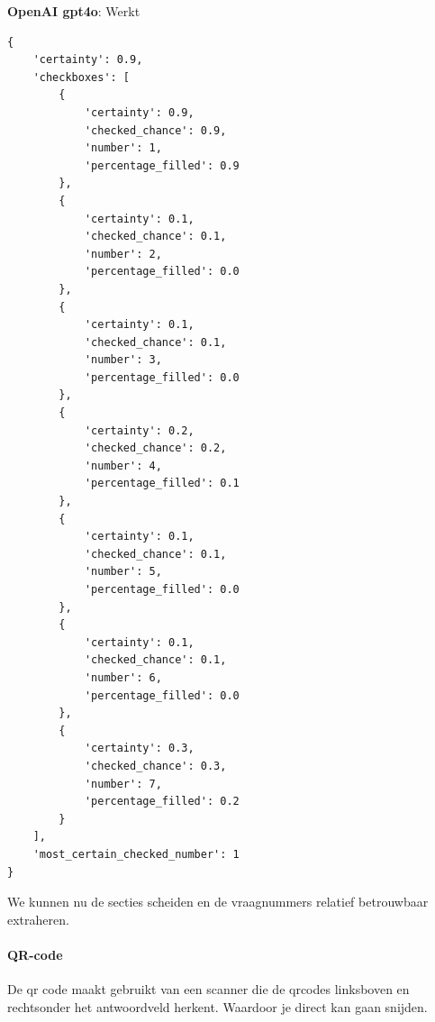 \documentclass[12pt]{article}
\begin{document}
\begin{samepage}
    
\textbf{OpenAI gpt4o}: Werkt
\begin{listing}[H]
    
    \begin{verbatim}
{
    'certainty': 0.9, 
    'checkboxes': [
        {
            'certainty': 0.9, 
            'checked_chance': 0.9, 
            'number': 1, 
            'percentage_filled': 0.9
        }, 
        {
            'certainty': 0.1, 
            'checked_chance': 0.1, 
            'number': 2, 
            'percentage_filled': 0.0
        }, 
        {
            'certainty': 0.1, 
            'checked_chance': 0.1, 
            'number': 3, 
            'percentage_filled': 0.0
        }, 
        {
            'certainty': 0.2, 
            'checked_chance': 0.2, 
            'number': 4, 
            'percentage_filled': 0.1
        }, 
        {
            'certainty': 0.1, 
            'checked_chance': 0.1, 
            'number': 5, 
            'percentage_filled': 0.0
        }, 
        {
            'certainty': 0.1, 
            'checked_chance': 0.1, 
            'number': 6, 
            'percentage_filled': 0.0
        },
        {
            'certainty': 0.3, 
            'checked_chance': 0.3, 
            'number': 7, 
            'percentage_filled': 0.2
        }
    ], 
    'most_certain_checked_number': 1
}
\end{verbatim}
\end{listing}
\begin{multicols}{2}
We kunnen nu de secties scheiden en de vraagnummers relatief betrouwbaar extraheren.
\end{multicols}
\end{samepage}

\pagebreak

\paragraph*{QR-code}De qr code maakt gebruikt van een scanner die de qrcodes linksboven en rechtsonder het antwoordveld herkent. Waardoor je direct kan gaan snijden.\\
\end{document}
